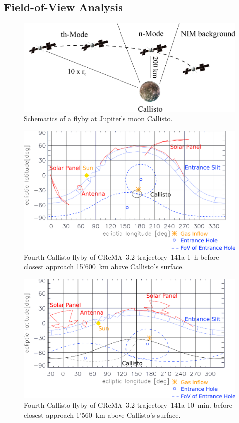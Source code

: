 	\subsection{Field-of-View Analysis }\label{subsubsec:Calfly}
	\begin{figure}[h!]
		\centering
		\includegraphics[width=.8\textwidth]{Bilder/Callisto_flyby_schematic.png}
		\caption{Schematics of a flyby at Jupiter's moon Callisto.}
		\label{fig:CalflybySchem}
	\end{figure}
	\begin{figure}[h!]
		\centering
		\includegraphics[width = .7\textwidth]{Bilder/NIM_pointing_2031JAN15185200.png}
		\caption{Fourth Callisto flyby of CReMA~3.2 trajectory~141a \cite{SOC_Crema3p2} 1~h before closest approach 15'600~km above Callisto's surface.}
		\label{fig:FlybyCal1852}
	\end{figure}
	\begin{figure}[h!]
		\centering
		\includegraphics[width = .7\textwidth]{Bilder/NIM_pointing_2031JAN15194200.png}
		\caption{Fourth Callisto flyby of CReMA~3.2 trajectory~141a \cite{SOC_Crema3p2} 10~min. before closest approach 1'560~km above Callisto's surface.}
		\label{fig:FlybyCal1942}
	\end{figure}
